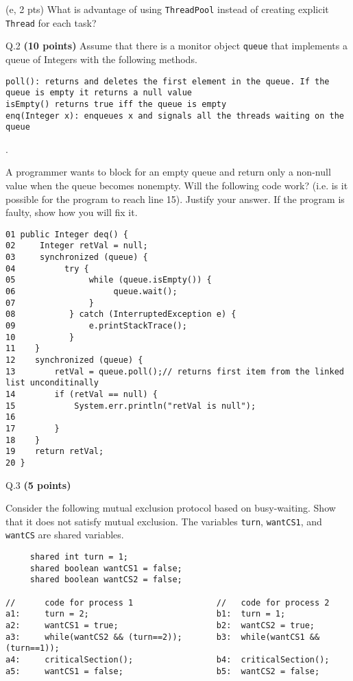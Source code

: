\documentclass[10pt]{article}
\begin{document}
\vspace{3.3in}

\noindent
(e, 2 pts) 
What is advantage of using {\tt ThreadPool} instead of creating explicit {\tt Thread} for each 
task?


\pagebreak

\noindent
Q.2 {\bf (10 points)}
Assume that there is a monitor object {\tt queue} that implements a queue of Integers with 
the following methods.
\begin{verbatim}
poll(): returns and deletes the first element in the queue. If the queue is empty it returns a null value
isEmpty() returns true iff the queue is empty
enq(Integer x): enqueues x and signals all the threads waiting on the queue
\end{verbatim}.

A programmer wants to block for an empty queue and return only a non-null value when 
the queue becomes nonempty. Will the following code work? (i.e. is it possible for
the program to reach line 15). Justify your answer.
If the program is faulty, show how you will fix it.

\begin{verbatim}
01 public Integer deq() {
02     Integer retVal = null;
03     synchronized (queue) {
04          try {
05               while (queue.isEmpty()) {
06                    queue.wait();
07               }
08           } catch (InterruptedException e) {
09               e.printStackTrace();
10           }
11    }
12    synchronized (queue) {
13        retVal = queue.poll();// returns first item from the linked list unconditinally
14        if (retVal == null) {
15            System.err.println("retVal is null");
16
17        }
18    }
19    return retVal;
20 }
\end{verbatim}

\pagebreak

\noindent
Q.3 {\bf (5 points)}

Consider the following mutual exclusion protocol based on busy-waiting.
Show that it does not satisfy mutual exclusion. The variables {\tt turn},
{\tt wantCS1}, and {\tt wantCS} are shared variables.

\begin{verbatim} 
     shared int turn = 1;
     shared boolean wantCS1 = false;
     shared boolean wantCS2 = false;

//      code for process 1                 //   code for process 2
a1:     turn = 2;                          b1:  turn = 1;
a2:     wantCS1 = true;                    b2:  wantCS2 = true;
a3:     while(wantCS2 && (turn==2));       b3:  while(wantCS1 && (turn==1));
a4:     criticalSection();                 b4:  criticalSection();
a5:     wantCS1 = false;                   b5:  wantCS2 = false;
\end{verbatim}
\end{document}
